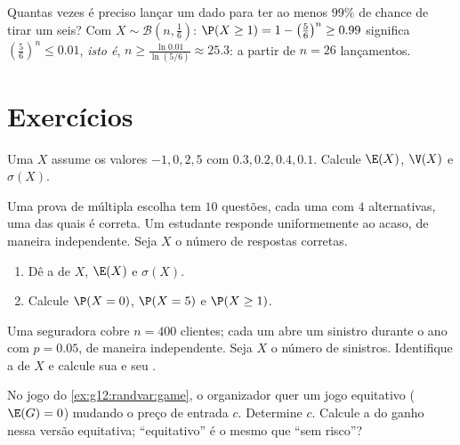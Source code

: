 \begin{example}\label{ex:g12:randvar:atleastone}
Quantas vezes é preciso lançar um dado para ter ao menos $99\%$ de chance
de tirar um seis? Com $X \sim \mathcal B\left(n, \frac16\right)$:
$\P(X \geq 1) = 1 - \left(\frac56\right)^n \geq 0.99$ significa
$\left(\frac56\right)^n \leq 0.01$, \emph{isto é},
$n \geq \frac{\ln 0.01}{\ln(5/6)} \approx 25.3$: a partir de $n = 26$
lançamentos.
\end{example}

\section{Exercícios}

\begin{exercise}[$\star$]\label{exo:g12:randvar:1}
Uma  $X$ assume os valores $-1, 0, 2, 5$ com
 $0.3, 0.2, 0.4, 0.1$. Calcule $\E(X)$, $\V(X)$ e
$\sigma(X)$.
\end{exercise}

\begin{exercise}[$\star$]\label{exo:g12:randvar:2}
Uma prova de múltipla escolha tem $10$ questões, cada uma com $4$
alternativas, uma das quais é correta. Um estudante responde
uniformemente ao acaso, de maneira independente. Seja $X$ o número de
respostas corretas.
\begin{enumerate}
  \item Dê a  de $X$, $\E(X)$ e $\sigma(X)$.
  \item Calcule $\P(X = 0)$, $\P(X = 5)$ e $\P(X \geq 1)$.
\end{enumerate}
\end{exercise}

\begin{exercise}[$\star$]\label{exo:g12:randvar:3}
Uma seguradora cobre $n = 400$ clientes; cada um abre um sinistro durante
o ano com  $p = 0.05$, de maneira independente. Seja $X$ o
número de sinistros. Identifique a  de $X$ e calcule sua
 e seu .
\end{exercise}

\begin{exercise}[$\star\star$]\label{exo:g12:randvar:4}
No jogo do \cref{ex:g12:randvar:game}, o organizador quer um jogo
equitativo ($\E(G) = 0$) mudando o preço de entrada $c$. Determine $c$.
Calcule a  do ganho nessa versão equitativa; ``equitativo'' é o
mesmo que ``sem risco''?
\end{exercise}


